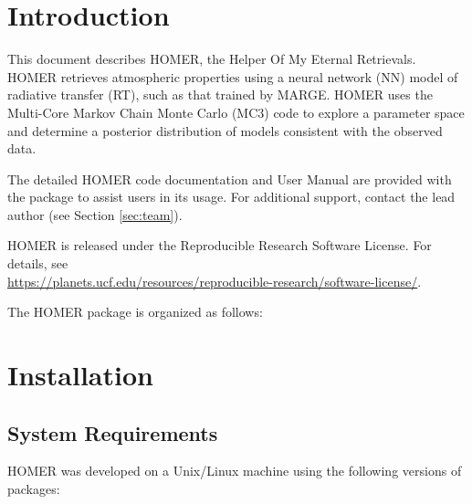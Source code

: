 \documentclass[letterpaper, 12pt]{article}
\begin{document}
\section{Introduction}
\label{sec:theory}

\noindent This document describes HOMER, the Helper Of My Eternal Retrievals.
HOMER retrieves atmospheric properties using a neural network (NN) model of 
radiative transfer (RT), such as that trained by MARGE.  HOMER uses the 
Multi-Core Markov Chain Monte Carlo (MC3) code to explore a parameter space 
and determine a posterior distribution of models consistent with the observed 
data.

The detailed HOMER code documentation and User Manual are provided 
with the package to assist users in its usage. For additional support, contact 
the lead author (see Section \ref{sec:team}).

HOMER is released under the Reproducible Research Software License.  
For details, see \\
\href{https://planets.ucf.edu/resources/reproducible-research/software-license/}{https://planets.ucf.edu/resources/reproducible-research/software-license/}.
\newline

\noindent The HOMER package is organized as follows: \newline
\noindent{}
\vspace{0.7cm}

\section{Installation}
\label{sec:installation}

\subsection{System Requirements}
\label{sec:requirements}

\noindent HOMER was developed on a Unix/Linux machine using the following 
versions of packages:
\end{document}

